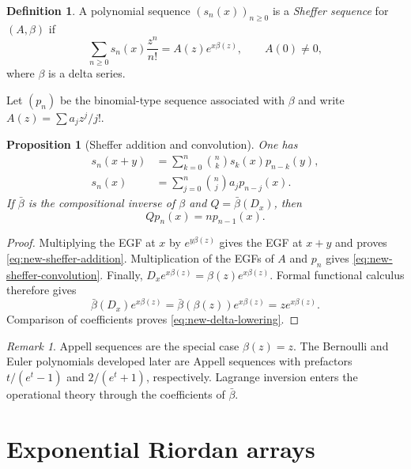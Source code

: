 \documentclass[11pt,a4paper,oneside,openany]{book}
\newtheorem{proposition}[theorem]{Proposition}
\theoremstyle{definition}
\newtheorem{definition}[theorem]{Definition}
\theoremstyle{remark}
\newtheorem{remark}[theorem]{Remark}
\begin{document}
\begin{definition}
A polynomial sequence $(s_n(x))_{n\ge0}$ is a \emph{Sheffer sequence} for
$(A,\beta)$ if
\begin{equation}\label{eq:new-sheffer-egf}
 \sum_{n\ge0}s_n(x)\frac{z^n}{n!}
 =A(z)e^{x\beta(z)},
 \qquad A(0)\ne0,
\end{equation}
where $\beta$ is a delta series.
\end{definition}

Let $(p_n)$ be the binomial-type sequence associated with $\beta$ and write
$A(z)=\sum a_jz^j/j!$.

\begin{proposition}[Sheffer addition and convolution]\label{prop:new-sheffer}
One has
\begin{align}
 s_n(x+y)&=\sum_{k=0}^n\binom nk s_k(x)p_{n-k}(y),
 \label{eq:new-sheffer-addition}\\
 s_n(x)&=\sum_{j=0}^n\binom nj a_jp_{n-j}(x).
 \label{eq:new-sheffer-convolution}
\end{align}
If $\bar\beta$ is the compositional inverse of $\beta$ and
$Q=\bar\beta(D_x)$, then
\begin{equation}\label{eq:new-delta-lowering}
 Qp_n(x)=np_{n-1}(x).
\end{equation}
\end{proposition}

\begin{proof}
Multiplying the EGF at $x$ by $e^{y\beta(z)}$ gives the EGF at $x+y$ and
proves \eqref{eq:new-sheffer-addition}.  Multiplication of the EGFs of $A$
and $p_n$ gives \eqref{eq:new-sheffer-convolution}.  Finally,
$D_xe^{x\beta(z)}=\beta(z)e^{x\beta(z)}$.  Formal functional calculus therefore
gives
\[
 \bar\beta(D_x)e^{x\beta(z)}
 =\bar\beta(\beta(z))e^{x\beta(z)}
 =ze^{x\beta(z)}.
\]
Comparison of coefficients proves \eqref{eq:new-delta-lowering}.
\end{proof}

\begin{remark}
Appell sequences are the special case $\beta(z)=z$.  The Bernoulli and Euler
polynomials developed later are Appell sequences with prefactors
$t/(e^t-1)$ and $2/(e^t+1)$, respectively.  Lagrange inversion enters the
operational theory through the coefficients of $\bar\beta$.
\end{remark}

\section{Exponential Riordan arrays}
\end{document}
